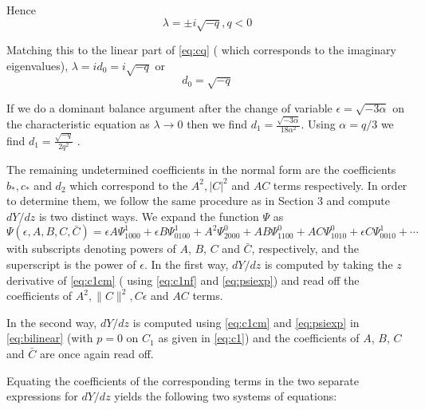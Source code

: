 Hence
\begin{equation}
\lambda = \pm i \sqrt{-q}, q < 0
\end{equation}

Matching this to the linear part of \eqref{eq:cq} ( which corresponds to the imaginary eigenvalues), $\lambda = i d_0 = i \sqrt{-q}$ or 
\begin{equation}
d_0 = \sqrt{-q}
\end{equation}


If we do a dominant balance argument after the change of variable $\epsilon = \sqrt{-3 \alpha}$ on the characteristic equation as $\lambda \rightarrow 0 $ then we find $d_1 = \frac{ \sqrt{-3 \alpha} }{18 \alpha^2 } $. Using $\alpha=q/3$ we find $d_1 = \frac{\sqrt{-q}}{2 q^2} $ .

The remaining undetermined coefficients  in the normal form are the 
coefficients $b_*,c_*$ and $d_2$ 
which correspond to the $A^2, |C|^2$ and $AC$ terms respectively. In 
order to determine them, we follow the same procedure as 
in Section 3 and compute $dY/dz$ is two distinct ways. We expand the
function $\Psi$ as
\begin{equation}\label{eq:psiexp}
\Psi(\epsilon,A,B,C,\bar{C}) = \epsilon A \Psi_{1000}^1 + \epsilon B \Psi_{0100}^1 + A^2 \Psi_{2000}^0 + A B \Psi_{1100}^0 + A C \Psi_{1010}^0 + \epsilon C \Psi_{0010}^1 + \cdots 
\end{equation}
with subscripts denoting powers of $A$, $B$, $C$ and $\bar{C}$, respectively,
and the superscript is the power of $\epsilon$. In the first way,
$dY/dz$ is computed by taking the $z$ derivative of \eqref{eq:c1cm} ( 
using \eqref{eq:c1nf} and \eqref{eq:psiexp}) and read off the coefficients
of $A^2, \|C\|^2, C \epsilon$ and $AC$ terms.

In the second way, $dY/dz$ is computed using 
\eqref{eq:c1cm} and \eqref{eq:psiexp} in \eqref{eq:bilinear} 
(with $p=0$ on $C_1$ as given in \eqref{eq:c1})
and the coefficients of  $A$, $B$, $C$ and $\bar{C}$ are once
again read off.

Equating the coefficients of the corresponding terms in the two
separate expressions for $dY/dz$ yields the following two systems of equations:

